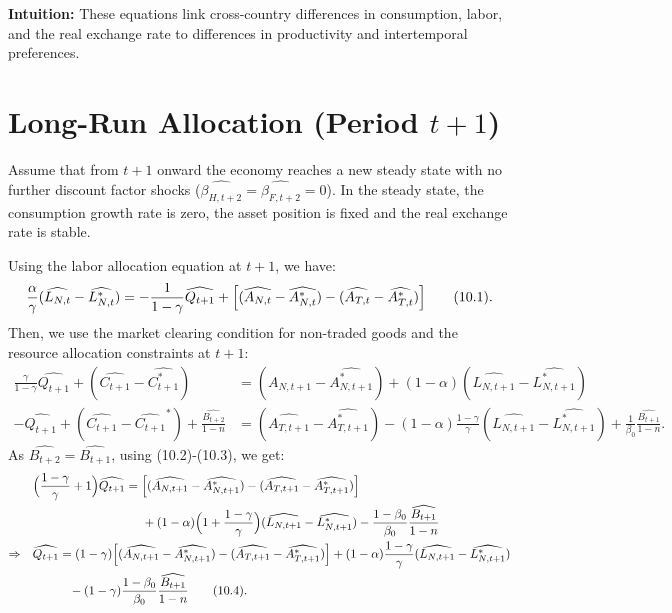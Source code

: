 \documentclass[a4paper,12pt]{article} %
\theoremstyle{nonitalic}
\begin{document}
\textbf{Intuition:} These equations link cross-country differences in consumption, labor, and the real exchange rate to differences in productivity and intertemporal preferences.

\section{Long-Run Allocation (Period $t+1$)}

Assume that from $ t+1 $ onward the economy reaches a new steady state with no further discount factor shocks ($ \widehat{\beta_{H,t+2}} = \widehat{\beta_{F,t+2}} = 0 $).
In the steady state, the consumption growth rate is zero, the asset position is fixed and the real exchange rate is stable. 

Using the labor allocation equation at $ t+1 $, we have:
\[
\frac{\alpha}{\gamma} (\widehat{L_{N,t}} - \widehat{L_{N,t}^*}) = -\frac{1}{1-\gamma} \widehat{Q_{t+1}} + \Bigl[ (\widehat{A_{N,t}} - \widehat{A_{N,t}^*}) - (\widehat{A_{T,t}} - \widehat{A_{T,t}^*}) \Bigr] \tag{10.1}.
\]
Then, we use the market clearing condition for non-traded goods and the resource allocation constraints at $ t+1 $:
\begin{align*}
    \frac{\gamma}{1-\gamma} \widehat{Q_{t+1}} + (\widehat{C_{t+1}} - \widehat{C_{t+1}^*}) &= (\widehat{A_{N,t+1}} - \widehat{A_{N,t+1}^*}) + (1-\alpha )(\widehat{L_{N,t+1}} - \widehat{L_{N,t+1}^*}) \tag{10.2} \\
    -\widehat{Q_{t+1}} + (\widehat{C_{t+1}} - \widehat{C_{t+1}}^*) + \frac{\widehat{B_{t+2}}}{1-n} &= (\widehat{A_{T,t+1}} - \widehat{A_{T,t+1}^*}) - (1-\alpha) \frac{1-\gamma}{\gamma} (\widehat{L_{N,t+1}} - \widehat{L_{N,t+1}^*}) + \frac{1}{\beta_0} \frac{\widehat{B_{t+1}}}{1-n}. \tag{10.3}
\end{align*}
As $\widehat{B_{t+2}} = \widehat{B_{t+1}}$, using (10.2)-(10.3), we get:
\begin{align*}
    & \quad \Bigl(\frac{1-\gamma}{\gamma} + 1 \Bigr) \widehat{Q_{t+1}} = \Bigl[ (\widehat{A_{N,t+1}} - \widehat{A_{N,t+1}^*}) - (\widehat{A_{T,t+1}} - \widehat{A_{T,t+1}^*}) \Bigr] \\
    &\quad\quad\quad\quad\quad\quad\quad\quad\quad\quad + (1-\alpha) \Bigl(1 + \frac{1-\gamma}{\gamma}\Bigr) (\widehat{L_{N,t+1}} - \widehat{L_{N,t+1}^*}) - \frac{1-\beta_0}{\beta_0} \frac{\widehat{B_{t+1}}}{1-n} \\
    \Rightarrow & \quad \widehat{Q_{t+1}} = (1-\gamma)\Bigl[ (\widehat{A_{N,t+1}} - \widehat{A_{N,t+1}^*}) - (\widehat{A_{T,t+1}} - \widehat{A_{T,t+1}^*}) \Bigr] + (1-\alpha) \frac{1-\gamma}{\gamma} (\widehat{L_{N,t+1}} - \widehat{L_{N,t+1}^*}) \\ 
    &\quad\quad\quad\quad- (1-\gamma) \frac{1-\beta_0}{\beta_0} \frac{\widehat{B_{t+1}}}{1-n} \tag{10.4}.
\end{align*}
\end{document}
